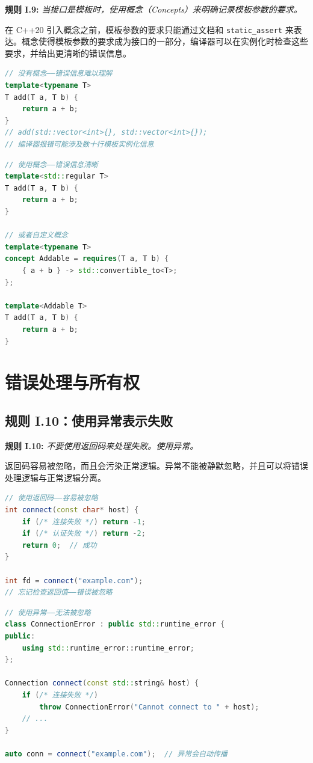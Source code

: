 \textbf{规则 I.9:} \textit{当接口是模板时，使用概念（Concepts）来明确记录模板参数的要求。}

在 C++20 引入概念之前，模板参数的要求只能通过文档和 \texttt{static\_assert} 来表达。概念使得模板参数的要求成为接口的一部分，编译器可以在实例化时检查这些要求，并给出更清晰的错误信息。

\begin{lstlisting}[language=C++]
// 没有概念——错误信息难以理解
template<typename T>
T add(T a, T b) {
    return a + b;
}
// add(std::vector<int>{}, std::vector<int>{});
// 编译器报错可能涉及数十行模板实例化信息
\end{lstlisting}

\begin{lstlisting}[language=C++]
// 使用概念——错误信息清晰
template<std::regular T>
T add(T a, T b) {
    return a + b;
}

// 或者自定义概念
template<typename T>
concept Addable = requires(T a, T b) {
    { a + b } -> std::convertible_to<T>;
};

template<Addable T>
T add(T a, T b) {
    return a + b;
}
\end{lstlisting}

\section{错误处理与所有权}

\subsection{规则 I.10：使用异常表示失败}

\textbf{规则 I.10:} \textit{不要使用返回码来处理失败。使用异常。}

返回码容易被忽略，而且会污染正常逻辑。异常不能被静默忽略，并且可以将错误处理逻辑与正常逻辑分离。

\begin{lstlisting}[language=C++]
// 使用返回码——容易被忽略
int connect(const char* host) {
    if (/* 连接失败 */) return -1;
    if (/* 认证失败 */) return -2;
    return 0;  // 成功
}

int fd = connect("example.com");
// 忘记检查返回值——错误被忽略
\end{lstlisting}

\begin{lstlisting}[language=C++]
// 使用异常——无法被忽略
class ConnectionError : public std::runtime_error {
public:
    using std::runtime_error::runtime_error;
};

Connection connect(const std::string& host) {
    if (/* 连接失败 */)
        throw ConnectionError("Cannot connect to " + host);
    // ...
}

auto conn = connect("example.com");  // 异常会自动传播
\end{lstlisting}

